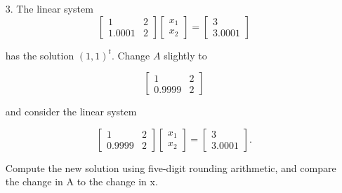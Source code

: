\begin{enumerate}
    \item[3.] The linear system
      \[
        \begin{bmatrix}
          1 & 2 \\
          1.0001 & 2
        \end{bmatrix}
        \begin{bmatrix}
          x_1 \\
          x_2
        \end{bmatrix}
        =
        \begin{bmatrix}
          3 \\
          3.0001
        \end{bmatrix}
      \]

      has the solution \((1, 1)^t\). Change \(A\) slightly to

      \[
        \begin{bmatrix}
          1 & 2 \\
          0.9999 & 2
        \end{bmatrix}
      \]

      and consider the linear system

      \[
        \begin{bmatrix}
          1 & 2 \\
          0.9999 & 2
        \end{bmatrix}
        \begin{bmatrix}
          x_1 \\
          x_2
        \end{bmatrix}
        =
        \begin{bmatrix}
          3 \\
          3.0001
        \end{bmatrix}.
      \]

      Compute the new solution using five-digit rounding arithmetic,
      and compare the change in A to the change in x.


\end{enumerate}
